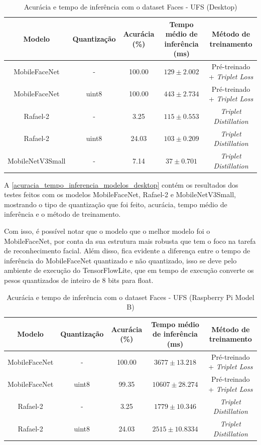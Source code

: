 \begin{table}[htb]
\centering
\ABNTEXfontereduzida
\caption[]{Acurácia e tempo de inferência com o dataset Faces - UFS (Desktop)}
\label{acuracia_tempo_inferencia_modelos_desktop}
\begin{tabular}{ |c|c|c|c|c| }
	\hline
	\textbf{Modelo} & \textbf{Quantização} & \textbf{Acurácia (\%)} & \textbf{Tempo médio de inferência (ms)} & \textbf{Método de treinamento} \\
	\hline
	MobileFaceNet 	&-	& 	100.00  & $129 \pm 2.002$ & Pré-treinado + \textit{Triplet Loss} \\
	MobileFaceNet 	&uint8	& 	100.00  & $443 \pm 2.734$ & Pré-treinado + \textit{Triplet Loss} \\
	Rafael-2	&-	& 	 3.25 & $115 \pm 0.553$ & \textit{Triplet Distillation} \\
	Rafael-2	&uint8	& 	 24.03& $103 \pm 0.209$ & \textit{Triplet Distillation} \\
	MobileNetV3Small&-	& 	 7.14& $37 \pm 0.701$ & \textit{Triplet Distillation} \\
	\hline
\end{tabular}
\end{table}

A \autoref{acuracia_tempo_inferencia_modelos_desktop} contém os resultados dos testes feitos com os modelos
MobileFaceNet, Rafael-2 e MobileNetV3Small, mostrando o tipo de quantização que foi feito, acurácia, tempo
médio de inferência e o método de treinamento.

Com isso, é possível notar que o modelo que o melhor modelo foi o MobileFaceNet, por conta da sua estrutura
mais robusta que tem o foco na tarefa de reconhecimento facial. Além disso, fica evidente a diferença entre
o tempo de inferência do MobileFaceNet quantizado e não quantizado, isso se deve pelo ambiente de execução
do TensorFlowLite, que em tempo de execução converte os pesos quantizados de inteiro de 8 bits para float.


\begin{table}[htb]
\centering
\ABNTEXfontereduzida
\caption[]{Acurácia e tempo de inferência com o dataset Faces - UFS (Raspberry Pi Model B)}
\label{acuracia_tempo_inferencia_modelos_raspberry}
\begin{tabular}{ |c|c|c|c|c| }
	\hline
	\textbf{Modelo} & \textbf{Quantização} & \textbf{Acurácia (\%)} & \textbf{Tempo médio de inferência (ms)} & \textbf{Método de treinamento} \\
	\hline
	MobileFaceNet 	&-	& 	100.00  & $3677 \pm 13.218$ & Pré-treinado + \textit{Triplet Loss} \\
	MobileFaceNet 	&uint8	& 	 99.35  & $10607 \pm 28.274$ & Pré-treinado + \textit{Triplet Loss} \\
	Rafael-2	&-	& 	 3.25 	& $1779 \pm 10.346$ & \textit{Triplet Distillation} \\
	Rafael-2	&uint8	& 	 24.03	& $2515 \pm 10.8334$ & \textit{Triplet Distillation} \\
	\hline
\end{tabular}
\end{table}

